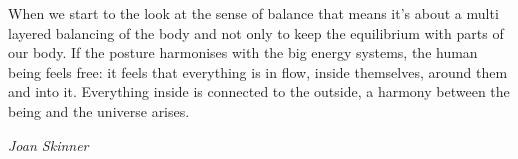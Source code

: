 \documentclass[../main.tex]{subfiles}
\begin{document}
        \setlength\epigraphwidth{\textwidth}
        
        \epigraph{When we start to the look at the sense of balance that means it's about a multi layered balancing of the body and not only to keep the equilibrium with parts of our body.
          If the posture harmonises with the big energy systems, the human being feels free: it feels that everything is in flow, inside themselves, around them and into it.
          Everything inside is connected to the outside, a harmony between the being and the universe arises.}{\textit{Joan Skinner}}
        \setlength{}
\end{document}

